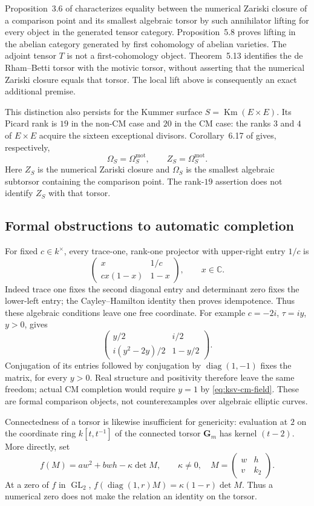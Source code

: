 Proposition~3.6 of \cite{KSV} characterizes equality between the
numerical Zariski closure of a comparison point and its smallest
algebraic torsor by such annihilator lifting for every object in the
generated tensor category.  Proposition~5.8 proves lifting in the
abelian category generated by first cohomology of abelian varieties.
The adjoint tensor $T$ is not a first-cohomology object.  Theorem~5.13
identifies the de Rham--Betti torsor with the motivic torsor, without
asserting that the numerical Zariski closure equals that torsor.
The local lift above is consequently an exact additional premise.

This distinction also persists for the Kummer surface
$S=\operatorname{Km}(E\times E)$.  Its Picard rank is $19$ in the
non-CM case and $20$ in the CM case: the ranks $3$ and $4$ of
$E\times E$ acquire the sixteen exceptional divisors.  Corollary~6.17
of \cite{KSV} gives, respectively,
\[
 \Omega_S=\Omega_S^{\mathrm{mot}},\qquad
 Z_S=\Omega_S^{\mathrm{mot}}.
\]
Here $Z_S$ is the numerical Zariski closure and $\Omega_S$ is the
smallest algebraic subtorsor containing the comparison point.  The
rank-$19$ assertion does not identify $Z_S$ with that torsor.

\subsection{Formal obstructions to automatic completion}
For fixed $c\in k^\times$, every trace-one, rank-one projector with
upper-right entry $1/c$ is
\[
 \begin{pmatrix}x&1/c\\cx(1-x)&1-x\end{pmatrix},\qquad x\in\mathbb C.
\]
Indeed trace one fixes the second diagonal entry and determinant zero
fixes the lower-left entry; the Cayley--Hamilton identity then proves
idempotence.  Thus these algebraic conditions leave one free coordinate.
For example $c=-2i$, $\tau=iy$, $y>0$, gives
\[
 \begin{pmatrix}y/2&i/2\\i(y^2-2y)/2&1-y/2\end{pmatrix}.
\]
Conjugation of its entries followed by conjugation by
$\operatorname{diag}(1,-1)$ fixes the matrix, for every $y>0$.
Real structure and positivity therefore leave the same freedom;
actual CM completion would require $y=1$ by
\eqref{eq:ksv-cm-field}.  These are formal comparison objects, not
counterexamples over algebraic elliptic curves.

Connectedness of a torsor is likewise insufficient for genericity:
evaluation at $2$ on the coordinate ring $k[t,t^{-1}]$ of the connected
torsor $\mathbf G_m$ has kernel $(t-2)$.  More directly, set
\[
 f(M)=aw^2+bwh-\kappa\det M,\qquad \kappa\ne0,
 \quad M=\begin{pmatrix}w&h\\v&k_2\end{pmatrix}.
\]
At a zero of $f$ in $\operatorname{GL}_2$,
$f(\operatorname{diag}(1,r)M)=\kappa(1-r)\det M$.
Thus a numerical zero does not make the relation an identity on the
torsor.

